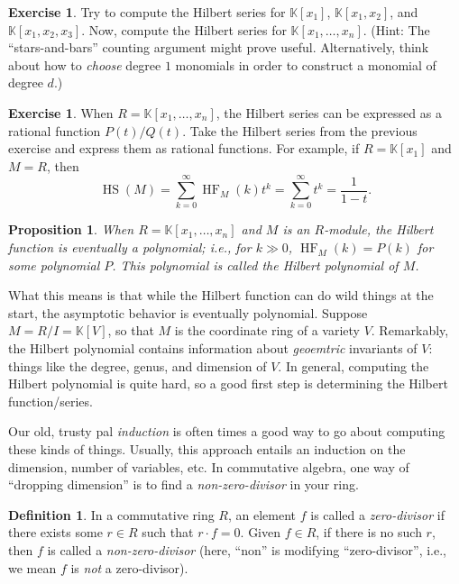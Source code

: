 \documentclass[12pt,a4paper]{article}
\newcommand{\KK}{\mathbb{K}}
\DeclareMathOperator{\HF}{HF}
\DeclareMathOperator{\HS}{HS}
\newtheorem{proposition}[theorem]{Proposition}
\theoremstyle{definition}
\newtheorem{definition}[theorem]{Definition}
\newtheorem{exercise}[theorem]{Exercise}
\numberwithin{equation}{section}
\begin{document}
\begin{exercise}\label{exercise: hilbert polynomial ring}
    Try to compute the Hilbert series for $\KK[x_1]$, $\KK[x_1,x_2]$, and $\KK[x_1,x_2,x_3]$.
    Now, compute the Hilbert series for $\KK[x_1,\dots,x_n]$.
    (Hint: The ``stars-and-bars'' counting argument might prove useful.
    Alternatively, think about how to \emph{choose} degree $1$ monomials in order to construct a monomial of degree $d$.)
\end{exercise}

\begin{exercise}
    When $R = \KK[x_1,\dots,x_n]$, the Hilbert series can be expressed as a rational function $P(t) / Q(t)$.
    Take the Hilbert series from the previous exercise and express them as rational functions.
    For example, if $R = \KK[x_1]$ and $M = R$, then
    \begin{equation*}
        \HS(M) = \sum_{k=0}^\infty \HF_M(k) t^k = \sum_{k=0}^\infty t^k = \frac{1}{1-t}.
    \end{equation*}
\end{exercise}

\begin{proposition}
    When $R = \KK[x_1,\dots,x_n]$ and $M$ is an $R$-module, the Hilbert function is eventually a polynomial; i.e., for $k \gg 0$, $\HF_M(k) = P(k)$ for some polynomial $P$.
    This polynomial is called the \emph{Hilbert polynomial} of $M$.
\end{proposition}

What this means is that while the Hilbert function can do wild things at the start, the asymptotic behavior is eventually polynomial.
Suppose $M = R/I = \KK[V]$, so that $M$ is the coordinate ring of a variety $V$.
Remarkably, the Hilbert polynomial contains information about \emph{geoemtric} invariants of $V$: things like the degree, genus, and dimension of $V$.
In general, computing the Hilbert polynomial is quite hard, so a good first step is determining the Hilbert function/series.

Our old, trusty pal \emph{induction} is often times a good way to go about computing these kinds of things.
Usually, this approach entails an induction on the dimension, number of variables, etc.
In commutative algebra, one way of ``dropping dimension'' is to find a \emph{non-zero-divisor} in your ring.

\begin{definition}
    In a commutative ring $R$, an element $f$ is called a \emph{zero-divisor} if there exists some $r \in R$ such that $r \cdot f = 0$.
    Given $f \in R$, if there is no such $r$, then $f$ is called a \emph{non-zero-divisor} (here, ``non'' is modifying ``zero-divisor'', i.e., we mean $f$ is \emph{not} a zero-divisor).
\end{definition}
\end{document}
